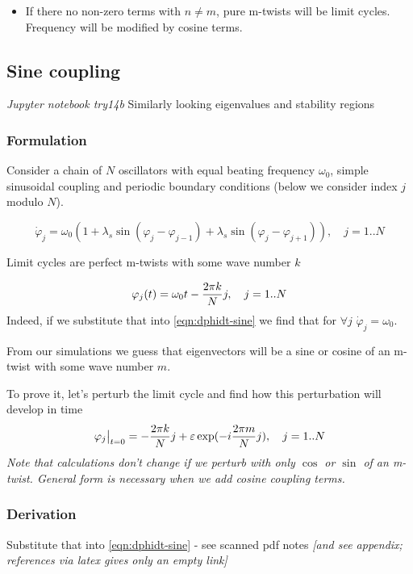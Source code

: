 \documentclass[a4paper,10pt]{article}
\newcommand*{\eps}{\varepsilon}
\begin{document}
\begin{itemize}
\item If there no non-zero terms with $n \neq m$, pure m-twists will be limit cycles. Frequency will be modified by cosine terms.
\end{itemize}



\subsection{Sine coupling }
\textit{Jupyter notebook try14b
}
Similarly looking eigenvalues and stability regions \cite{zou2009}
\subsubsection{Formulation}

Consider a chain of $N$ oscillators with equal beating frequency $\omega_0$, simple sinusoidal coupling and periodic boundary conditions (below we consider index $j$ modulo $N$).

\begin{equation}
\dot \varphi_j = \omega_0 (
1 + \lambda_s \sin(\varphi_j - \varphi_{j-1})
+ \lambda_s \sin(\varphi_j - \varphi_{j+1})), \quad j=1..N
\label{eqn:dphidt-sine}
\end{equation}

Limit cycles are perfect m-twists with some wave number $k$

$$
\varphi_j(t) = \omega_0 t - \frac{2 \pi k} {N} j, \quad j=1..N
$$
Indeed, if we substitute that into \eqref{eqn:dphidt-sine} we find that for  $\forall j$ $\dot \varphi_j = \omega_0$.

From our simulations we guess that eigenvectors will be a sine or cosine of an m-twist with some wave number $m$.

To prove it, let's perturb the limit cycle and find how this perturbation will develop in time
$$
\varphi_j \big\rvert_{t=0} = - \fr{k}{j} + \eps \exp( - i \fr{m}{j}), \quad j=1..N
$$
\textit{
Note that calculations don't change if we perturb with only $\cos$ or $\sin$ of an m-twist. General form is necessary when we add cosine coupling terms.
}

\subsubsection{Derivation}

Substitute that into \eqref{eqn:dphidt-sine} - see scanned pdf notes \textit{[and see appendix; references via latex gives only an empty link]}
\end{document}
